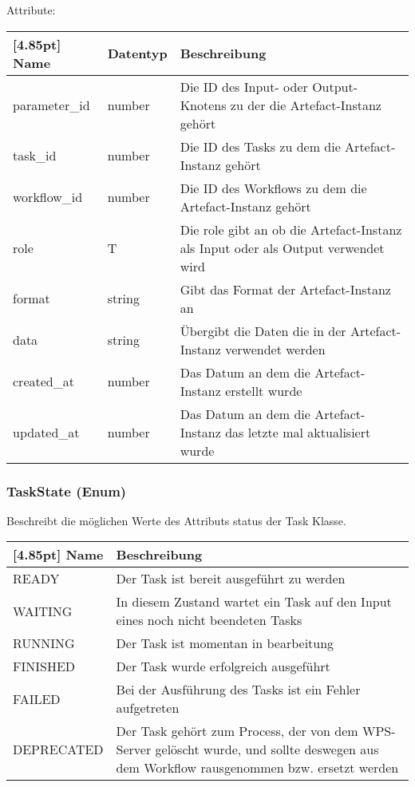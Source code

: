 			Attribute:
			\begin{center}
				\renewcommand{\arraystretch}{1.5}
				\setlength\tabcolsep{5pt}
				\begin{tabularx}{\textwidth}{|l|l|X|}
					\hline
					\rowcolor[gray]{0.75}[4.85pt]					
					Name & Datentyp & Beschreibung \\ \hline
					parameter_id & number & Die ID des Input- oder Output-Knotens zu der die Artefact-Instanz gehört \\ \hline
					task_id & number & Die ID des Tasks zu dem die Artefact-Instanz gehört \\ \hline
					workflow_id & number & Die ID des Workflows zu dem die Artefact-Instanz gehört \\ \hline
					role & T & Die role gibt an ob die Artefact-Instanz als Input oder als Output verwendet wird \\ \hline
					format & string & Gibt das Format der Artefact-Instanz an \\ \hline
					data & string & Übergibt die Daten die in der Artefact-Instanz verwendet werden \\ \hline
					created_at & number & Das Datum an dem die Artefact-Instanz erstellt wurde \\ \hline
					updated_at & number & Das Datum an dem die Artefact-Instanz das letzte mal aktualisiert wurde\\ \hline
				\end{tabularx}
			\end{center}
			
			\subsubsection{TaskState (Enum)}
			
			Beschreibt die möglichen Werte des Attributs status der Task Klasse.\newline
			
			\begin{center}
				\renewcommand{\arraystretch}{1.5}
				\setlength\tabcolsep{5pt}
				\begin{tabularx}{\textwidth}{|l|X|}
					\hline
					\rowcolor[gray]{0.75}[4.85pt]
					Name & Beschreibung \\ \hline
					READY & Der Task ist bereit ausgeführt zu werden \\ \hline
					WAITING & In diesem Zustand wartet ein Task auf den Input eines noch nicht beendeten Tasks \\ \hline
					RUNNING & Der Task ist momentan in bearbeitung \\ \hline
					FINISHED & Der Task wurde erfolgreich ausgeführt \\ \hline
					FAILED & Bei der Ausführung des Tasks ist ein Fehler aufgetreten \\ \hline
					DEPRECATED & Der Task gehört zum Process, der von dem WPS-Server gelöscht wurde, und sollte deswegen aus dem Workflow rausgenommen bzw. ersetzt werden \\ \hline
				\end{tabularx}
			\end{center}
				
